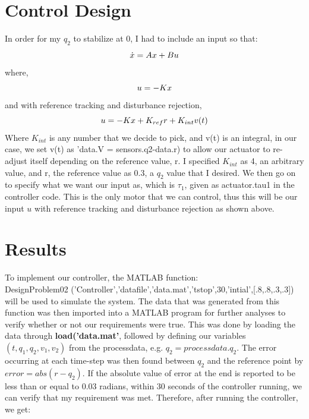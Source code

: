 \documentclass[12pt]{article}
\begin{document}
\section{Control Design}
In order for my $q_{2}$ to stabilize at 0, I had to include an input so that:
\begin{equation*}
    \dot{x} = Ax + Bu\\
\end{equation*}
 where,
 \begin{equation*}
    u = -Kx \\
\end{equation*}
and with reference tracking and disturbance rejection,
 \begin{equation*}
    u = -Kx + K_{ref}r + K_{int}v(t)\\
\end{equation*}
Where $K_{int}$ is any number that we decide to pick, and v(t) is an integral, in our case, we set v(t) as 'data.V = sensors.q2-data.r) to allow our actuator to re-adjust itself depending on the reference value, r. I specified $K_{int}$ as 4, an arbitrary value, and r, the reference value as 0.3, a $q_{2}$ value that I desired. We then go on to specify what we want our input as, which is $\tau_{1}$, given as actuator.tau1 in the controller code. This is the only motor that we can control, thus this will be our input $u$ with reference tracking and disturbance rejection as shown above.

\section{Results}

To implement our controller, the MATLAB function:\\ DesignProblem02 ('Controller','datafile','data.mat','tstop',30,'intial',[.8,.8,.3,.3]) will be used to simulate the system. The data that was generated from this function was then imported into a MATLAB program for further analyses to verify whether or not our requirements were true. 
This was done by loading the data through \textbf{load('data.mat'}, followed by defining our variables $(t,q_{1},q_{2},v_{1},v_{2})$ from the processdata, e.g. $q_{2} = processdata.q_{2}$. The error occurring at each time-step was then found between $q_{2}$ and the reference point by $error = abs(r-q_{2})$. If the absolute value of error at the end is reported to be less than or equal to 0.03 radians, within 30 seconds of the controller running, we can verify  that my requirement was met. Therefore,  after running the controller, we get:
\end{document}
